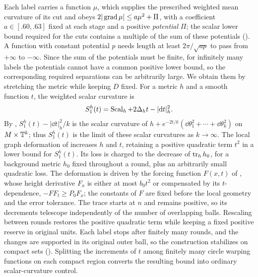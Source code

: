 Each label carries a function \(\mu\), which supplies the prescribed weighted mean curvature of
its cut and obeys \(2|\operatorname{grad}\mu|\le a\mu^2+\Pi\), with a coefficient
\(a\in[.60,.63]\) fixed at each stage and a positive
\emph{potential} \(\Pi\); the scalar lower bound required for the cuts
contains a multiple of the sum of these potentials
(). A function with constant potential \(p\)
needs length at least \(2\pi/\sqrt{ap}\) to pass from \(+\infty\) to
\(-\infty\). Since the sum of the potentials must be finite, for
infinitely many labels the potentials cannot
have a common positive lower bound, so the corresponding required
separations can be arbitrarily large. We obtain them by stretching the
metric while keeping \(D\) fixed. For a metric \(h\) and a smooth
function \(t\), the weighted scalar curvature is
\begin{equation}\label{intro:weighted-scalar}
 S^{h}_1(t)=\operatorname{Scal}_h+2\Delta_h t-|\mathrm d t|_h^2.
\end{equation}
By , \(S^{h}_1(t)-|\dd t|_h^2/k\) is the
scalar curvature of \(h+e^{-2t/k}(\dd\theta_1^2+\cdots+\dd\theta_k^2)\)
on \(M\times\mathbb T^k\); thus \(S^{h}_1(t)\) is the limit of these
scalar curvatures as \(k\to\infty\).
The local graph deformation of  increases \(h\) and
\(t\), retaining a positive quadratic term \(t^2\) in a lower bound for \(S^{h}_1(t)\). Its loss is charged
to the decrease of \(\operatorname{tr}_hh_0\), for a background metric \(h_0\)
fixed throughout a round, plus an arbitrarily small quadratic loss. The
deformation is driven by the forcing function \(F(x,t)\) of ,
whose height derivative \(F_x\) is either at most \(b_0t^2\) or
compensated by its \(t\)-dependence, \(-FF_t\ge P_0F_x\); the constants
of \(F\) are fixed before the local geometry and the error tolerance.
The trace starts at \(n\) and remains positive, so its decrements
telescope independently of the number of overlapping balls.
Rescaling between rounds restores the positive quadratic term while keeping
a fixed positive reserve in original units. Each label stops after
finitely many rounds, and the changes are supported in its original
outer ball, so the construction stabilizes on compact sets
(). Splitting the increments of \(t\) among finitely
many circle warping functions on each compact region converts the resulting bound
into ordinary scalar-curvature control.

